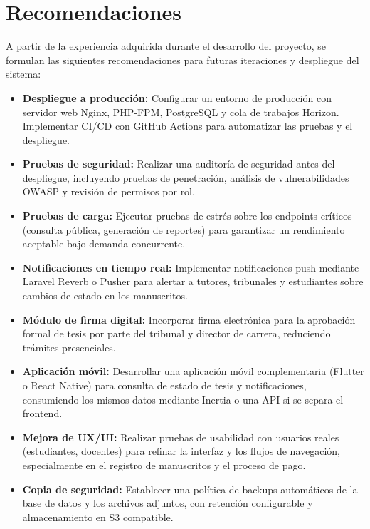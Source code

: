 \section{Recomendaciones}
\label{sec:recomendaciones}

A partir de la experiencia adquirida durante el desarrollo del proyecto, se formulan las siguientes recomendaciones para futuras iteraciones y despliegue del sistema:

\begin{itemize}
    \item \textbf{Despliegue a producción:} Configurar un entorno de producción con servidor web Nginx, PHP-FPM, PostgreSQL y cola de trabajos Horizon. Implementar CI/CD con GitHub Actions para automatizar las pruebas y el despliegue.
    \item \textbf{Pruebas de seguridad:} Realizar una auditoría de seguridad antes del despliegue, incluyendo pruebas de penetración, análisis de vulnerabilidades OWASP y revisión de permisos por rol.
    \item \textbf{Pruebas de carga:} Ejecutar pruebas de estrés sobre los endpoints críticos (consulta pública, generación de reportes) para garantizar un rendimiento aceptable bajo demanda concurrente.
    \item \textbf{Notificaciones en tiempo real:} Implementar notificaciones push mediante Laravel Reverb o Pusher para alertar a tutores, tribunales y estudiantes sobre cambios de estado en los manuscritos.
    \item \textbf{Módulo de firma digital:} Incorporar firma electrónica para la aprobación formal de tesis por parte del tribunal y director de carrera, reduciendo trámites presenciales.
    \item \textbf{Aplicación móvil:} Desarrollar una aplicación móvil complementaria (Flutter o React Native) para consulta de estado de tesis y notificaciones, consumiendo los mismos datos mediante Inertia o una API si se separa el frontend.
    \item \textbf{Mejora de UX/UI:} Realizar pruebas de usabilidad con usuarios reales (estudiantes, docentes) para refinar la interfaz y los flujos de navegación, especialmente en el registro de manuscritos y el proceso de pago.
    \item \textbf{Copia de seguridad:} Establecer una política de backups automáticos de la base de datos y los archivos adjuntos, con retención configurable y almacenamiento en S3 compatible.
\end{itemize}

\endinput
